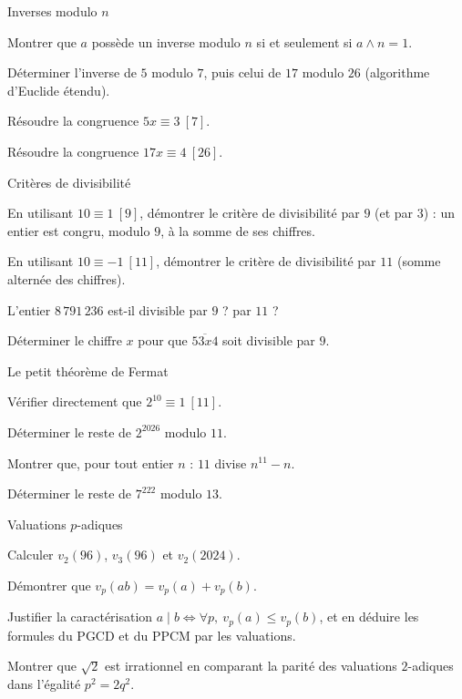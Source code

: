 \begin{exercice}[2]{Inverses modulo $n$}
\begin{questions}
  \item Montrer que $a$ possède un inverse modulo $n$ si et seulement si
    $a\wedge n=1$.
  \item Déterminer l'inverse de $5$ modulo $7$, puis celui de $17$ modulo
    $26$ (algorithme d'Euclide étendu).
  \item Résoudre la congruence $5x\equiv3\ [7]$.
  \item Résoudre la congruence $17x\equiv4\ [26]$.
\end{questions}
\end{exercice}

\begin{exercice}[2]{Critères de divisibilité}
\begin{questions}
  \item En utilisant $10\equiv1\ [9]$, démontrer le critère de divisibilité
    par $9$ (et par $3$) : un entier est congru, modulo $9$, à la somme de
    ses chiffres.
  \item En utilisant $10\equiv-1\ [11]$, démontrer le critère de
    divisibilité par $11$ (somme alternée des chiffres).
  \item L'entier $8\,791\,236$ est-il divisible par $9$ ? par $11$ ?
  \item Déterminer le chiffre $x$ pour que $\overline{53x4}$ soit divisible
    par $9$.
\end{questions}
\end{exercice}

\begin{exercice}[2]{Le petit théorème de Fermat}
\begin{questions}
  \item Vérifier directement que $2^{10}\equiv1\ [11]$.
  \item Déterminer le reste de $2^{2026}$ modulo $11$.
  \item Montrer que, pour tout entier $n$ : $11$ divise $n^{11}-n$.
  \item Déterminer le reste de $7^{222}$ modulo $13$.
\end{questions}
\end{exercice}

\begin{exercice}[2]{Valuations $p$-adiques}
\begin{questions}
  \item Calculer $v_2(96)$, $v_3(96)$ et $v_2(2024)$.
  \item Démontrer que $v_p(ab)=v_p(a)+v_p(b)$.
  \item Justifier la caractérisation
    $a\mid b\iff\forall p,\ v_p(a)\leq v_p(b)$, et en déduire les formules
    du PGCD et du PPCM par les valuations.
  \item Montrer que $\sqrt2$ est irrationnel en comparant la parité des
    valuations $2$-adiques dans l'égalité $p^{2}=2q^{2}$.
\end{questions}
\end{exercice}

